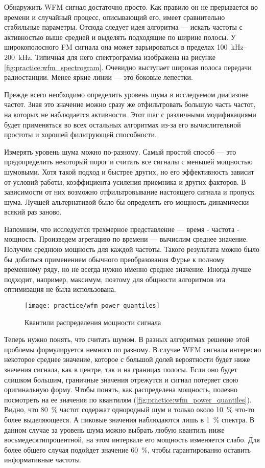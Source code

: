 Обнаружить WFM сигнал достаточно просто. Как правило он не прерывается во времени и случайный процесс, описывающий его, имеет сравнительно стабильные параметры. Отсюда следует идея алгоритма --- искать частоты с активностью выше средней и выделять подходящие по ширине полосы. У широкополосного FM сигнала она может варьироваться в пределах \SIrange{100}{200}{\kilo\hertz}. Типичная для него спектрограмма изображена на рисунке \ref{fig:practice:wfm_spectrogram}. Очевидно выступает широкая полоса передачи радиостанции. Менее яркие линии --- это боковые лепестки.

Прежде всего необходимо определить уровень шума в исследуемом диапазоне частот. Зная это значение можно сразу же отфильтровать большую часть частот, на которых не наблюдается активности. Этот шаг с различными модификациями будет применяться во всех остальных алгоритмах из-за его вычислительной простоты и хорошей фильтрующей способности.

Измерять уровень шума можно по-разному. Самый простой способ --- это предопределить некоторый порог и считать все сигналы с меньшей мощностью шумовыми. Хотя такой подход и быстрее других, но его эффективность зависит от условий работы, коэффициента усиления приемника и других факторов. В зависимости от них возможно отфильтровывание настоящего сигнала и пропуск шума. Лучшей альтернативой было бы определять его мощность динамически всякий раз заново.

Напомним, что исследуется трехмерное представление --- время - частота - мощность. Произведем агрегацию по времени --- вычислим среднее значение. Получим среднюю мощность для каждой частоты. Такого результата можно было бы добиться применением обычного преобразования Фурье к полному временному ряду, но не всегда нужно именно среднее значение. Иногда лучше подходит, например, максимум, поэтому для общности алгоритмов эта оптимизация не была использована.

\begin{figure}[h]
  \centering
  \texttt{[image: practice/wfm\_power\_quantiles]}
  \caption{Квантили распределения мощности сигнала}
  \label{fig:practice:wfm_power_quantiles}
\end{figure}

Теперь нужно понять, что считать шумом. В разных алгоритмах решение этой проблемы формулируется немного по разному. В случае WFM сигнала интересно некоторое среднее значение, которое с большой долей вероятности будет ниже значения сигнала, как в центре, так и на границах полосы. Если оно будет слишком большим, граничные значения отрежутся и сигнал потеряет свою оригинальную форму. Чтобы понять, как распределена мощность, полезно посмотреть на ее значения по квантилям (\autoref{fig:practice:wfm_power_quantiles}). Видно, что \SI{80}{\percent} частот содержат однородный шум и только около \SI{10}{\percent} что-то более выделяющееся. А пиковые значения наблюдаются лишь в \SI{1}{\percent} спектра. В данном случае за уровень шума можно выбрать любую квантиль ниже восьмедесятипроцентной, на этом интервале его мощность изменяется слабо. Для более общего случая подойдет значение \SI{60}{\percent}, чтобы гарантированно оставить информативные частоты.


